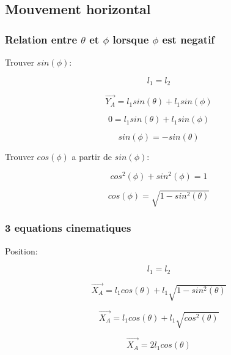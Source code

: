 \documentclass{article}
\begin{document}
\subsection{Mouvement horizontal}
\subsubsection{Relation entre $\theta$ et $\phi$ lorsque $\phi$ est negatif}
Trouver $sin(\phi)$:

\begin{equation}
l_1 = l_2
\end{equation}

\begin{equation}
\overrightarrow{Y_A} = l_1sin(\theta)+l_1sin(\phi)
\end{equation}

\begin{equation}
0 = l_1sin(\theta)+l_1sin(\phi)
\end{equation}

\begin{equation}
sin(\phi) = -sin(\theta)
\end{equation}

\noindent Trouver $cos(\phi)$ a partir de $sin(\phi)$:

\begin{equation}
cos^2(\phi)+sin^2(\phi) = 1
\end{equation}

\begin{equation}
cos(\phi) = \sqrt{1-sin^2(\theta)}
\end{equation}

\subsubsection{3 equations cinematiques}
Position:

\begin{equation}
l_1 = l_2
\end{equation}

\begin{equation}
\overrightarrow{X_A} = l_1cos(\theta)+l_1\sqrt{1-sin^2(\theta)}
\end{equation}

\begin{equation}
\overrightarrow{X_A} = l_1cos(\theta)+l_1\sqrt{cos^2(\theta)}
\end{equation}

\begin{equation}
\overrightarrow{X_A} = 2l_1cos(\theta)
\end{equation}
\end{document}

